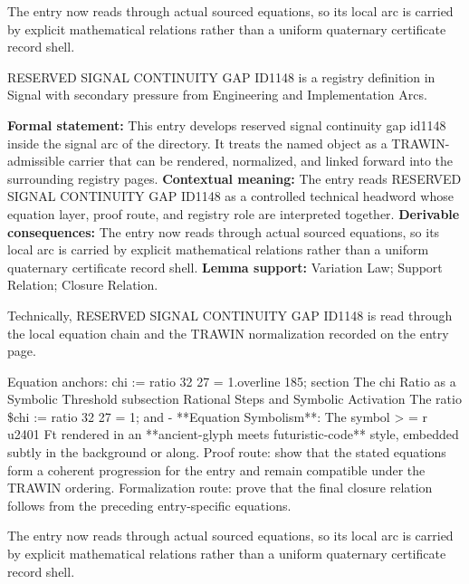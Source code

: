 The entry now reads through actual sourced equations, so its local arc is carried by explicit mathematical relations rather than a uniform quaternary certificate record shell.
\clearpage


\begingroup\small
{}
RESERVED SIGNAL CONTINUITY GAP ID1148 is a registry definition in Signal with secondary pressure from Engineering and Implementation Arcs.

\begingroup\footnotesize\setlength{\emergencystretch}{3em}\sloppy
\textbf{Formal statement:} This entry develops reserved signal continuity gap id1148 inside the signal arc of the directory. It treats the named object as a TRAWIN-admissible carrier that can be rendered, normalized, and linked forward into the surrounding registry pages. \textbf{Contextual meaning:} The entry reads RESERVED SIGNAL CONTINUITY GAP ID1148 as a controlled technical headword whose equation layer, proof route, and registry role are interpreted together. \textbf{Derivable consequences:} The entry now reads through actual sourced equations, so its local arc is carried by explicit mathematical relations rather than a uniform quaternary certificate record shell. \textbf{Lemma support:} Variation Law; Support Relation; Closure Relation.\par
\endgroup

Technically, RESERVED SIGNAL CONTINUITY GAP ID1148 is read through the local equation chain and the TRAWIN normalization recorded on the entry page.

Equation anchors: chi := ratio 32 27 = 1.overline 185; section The chi Ratio as a Symbolic Threshold subsection Rational Steps and Symbolic Activation The ratio \$chi := ratio 32 27 = 1; and - **Equation Symbolism**: The symbol > = r u2401 Ft rendered in an **ancient-glyph meets futuristic-code** style, embedded subtly in the background or along. Proof route: show that the stated equations form a coherent progression for the entry and remain compatible under the TRAWIN ordering. Formalization route: prove that the final closure relation follows from the preceding entry-specific equations.

The entry now reads through actual sourced equations, so its local arc is carried by explicit mathematical relations rather than a uniform quaternary certificate record shell.
\endgroup


